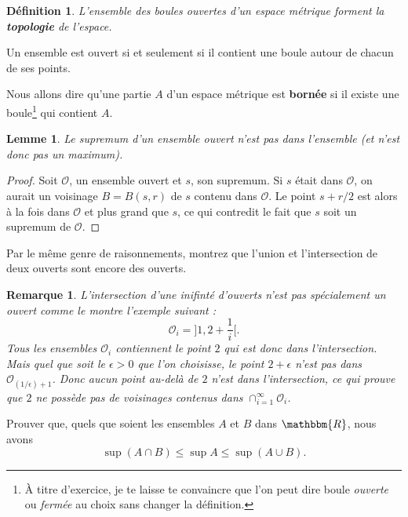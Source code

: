 \documentclass[a4paper,12pt]{book}
\newcommand{\eR}{\mathbbm{R}}
\newcounter{numtho}
\theoremstyle{mes_exemples}	\newtheorem{exemple}[numtho]{Exemple}
\newtheorem{remark}[numtho]{Remarque}
\theoremstyle{mes_tho}
\newtheorem{lemma}[numtho]{Lemme}
\newtheorem{definition}[numtho]{Définition}
\newcommand{\defe}[2]{\textbf{#1}\index{#2}}
\newcommand{\mO}{\mathcal{O}}
\begin{document}
\begin{definition}
L'ensemble des boules ouvertes d'un espace métrique forment la \defe{topologie}{Topologie!métrique} de l'espace.
\end{definition}

Un ensemble est ouvert si et seulement si il contient une boule autour de chacun de ses points.

Nous allons dire qu'une partie $A$ d'un espace métrique est \defe{bornée}{Bornée} si il existe une boule\footnote{À titre d'exercice, je te laisse te convaincre que l'on peut dire boule \emph{ouverte} ou \emph{fermée} au choix sans changer la définition.} qui contient $A$.

\begin{lemma}  \label{LemSupOuvPas}
Le supremum d'un ensemble ouvert n'est pas dans l'ensemble (et n'est donc pas un maximum).
\end{lemma}

\begin{proof}
Soit $\mO$, un ensemble ouvert et $s$, son supremum. Si $s$ était dans $\mO$, on aurait un voisinage $B=B(s,r)$ de $s$ contenu dans $\mO$. Le point $s+r/2$ est alors à la fois dans $\mO$ et plus grand que $s$, ce qui contredit le fait que $s$ soit un supremum de $\mO$.
\end{proof}

\begin{exercice}
Par le même genre de raisonnements, montrez que l'union et l'intersection de deux ouverts sont encore des ouverts.
\end{exercice}

\begin{remark}
L'intersection d'une \emph{inifinté} d'ouverts n'est pas spécialement un ouvert comme le montre l'exemple suivant :
\[ 
  \mO_i=]1,2+\frac{ 1 }{ i }[.
\]
Tous les ensembles $\mO_i$ contiennent le point $2$ qui est donc dans l'intersection. Mais quel que soit le $\epsilon>0$ que l'on choisisse, le point $2+\epsilon$ n'est pas dans $\mO_{(1/\epsilon)+1}$. Donc aucun point au-delà de $2$ n'est dans l'intersection, ce qui prouve que $2$ ne possède pas de voisinages contenus dans $\cap_{i=1}^{\infty}\mO_i$.
\end{remark}

\begin{exercice}
Prouver que, quels que soient les ensembles $A$ et $B$ dans $\eR$, nous avons
\[ 
  \sup(A\cap B)\leq\sup A\leq\sup(A\cup B).
\]
\end{exercice}
\end{document}
